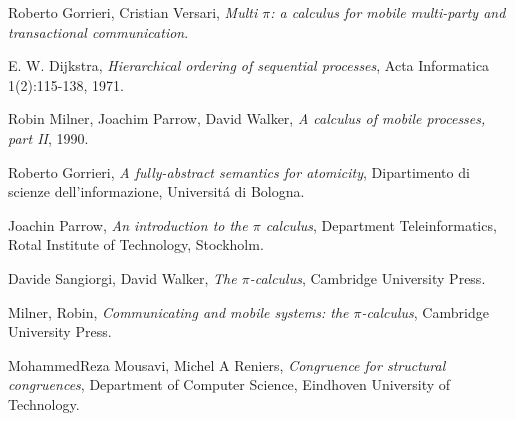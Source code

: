 \begin{thebibliography}{99}

  Roberto Gorrieri, Cristian Versari,
  \emph{Multi $\pi$: a calculus for mobile multi-party and transactional communication}.

  E. W. Dijkstra,
  \emph{Hierarchical ordering of sequential processes},
  Acta Informatica 1(2):115-138, 
  1971.

  Robin Milner, Joachim Parrow, David Walker,
  \emph{A calculus of mobile processes, part II},
  1990.


  Roberto Gorrieri,
  \emph{A fully-abstract semantics for atomicity},
  Dipartimento di scienze dell'informazione, 
  Universit\'a di Bologna.


  Joachin Parrow, 
  \emph{An introduction to the $\pi$ calculus},
  Department Teleinformatics,
  Rotal Institute of Technology,
  Stockholm.


  Davide Sangiorgi, David Walker,
  \emph{The $\pi$-calculus},
  Cambridge University Press.


  Milner, Robin, 
  \emph{Communicating and mobile systems: the $\pi$-calculus},
  Cambridge University Press.

  MohammedReza Mousavi, Michel A Reniers,
  \emph{Congruence for structural congruences},
  Department of Computer Science,
  Eindhoven University of Technology.

\end{thebibliography}
